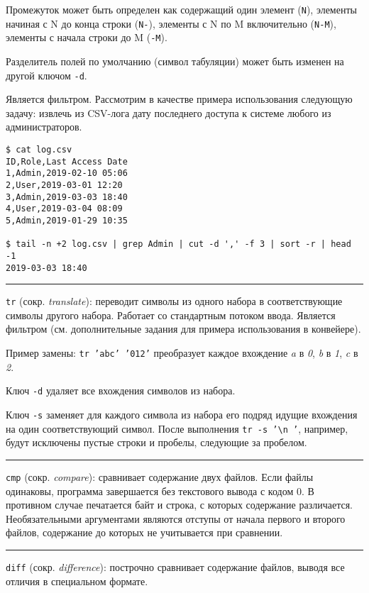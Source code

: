 \documentclass[listings]{labreport}
\begin{document}
Промежуток может быть определен как содержащий один элемент (\texttt{N}), элементы
начиная с N до конца строки (\texttt{N-}), элементы с N по M включительно (\texttt{N-M}),
элементы с начала строки до M (\texttt{-M}).

Разделитель полей по умолчанию (символ табуляции) может быть изменен на другой
ключом \texttt{-d}.

Является фильтром. Рассмотрим в качестве примера использования следующую задачу: извлечь
из CSV-лога дату последнего доступа к системе любого из администраторов.
\begin{verbatim}
$ cat log.csv
ID,Role,Last Access Date
1,Admin,2019-02-10 05:06
2,User,2019-03-01 12:20
3,Admin,2019-03-03 18:40
4,User,2019-03-04 08:09
5,Admin,2019-01-29 10:35

$ tail -n +2 log.csv | grep Admin | cut -d ',' -f 3 | sort -r | head -1
2019-03-03 18:40
\end{verbatim}

\noindent\rule{\textwidth}{1pt}

\texttt{tr} (сокр. \textit{translate}): переводит символы из одного набора
в соответствующие символы другого набора. Работает со стандартным потоком ввода. Является фильтром
(см. дополнительные задания для примера использования в конвейере).

Пример замены: \texttt{tr 'abc' '012'} преобразует каждое вхождение
\textit{a} в \textit{0}, \textit{b} в \textit{1}, \textit{c} в \textit{2}.

Ключ \texttt{-d} удаляет все вхождения символов из набора.

Ключ \texttt{-s} заменяет для каждого символа из набора его
подряд идущие вхождения на один соответствующий символ. После выполнения
\texttt{tr -s '{\textbackslash}n '}, например, будут исключены пустые строки и пробелы, следующие за пробелом.

\noindent\rule{\textwidth}{1pt}

\texttt{cmp} (сокр. \textit{compare}): сравнивает содержание двух файлов. Если файлы одинаковы,
программа завершается без текстового вывода с кодом 0. В противном случае печатается байт и строка,
с которых содержание различается. Необязательными аргументами являются отступы от начала первого и второго файлов,
содержание до которых не учитывается при сравнении.

\noindent\rule{\textwidth}{1pt}

\texttt{diff} (сокр. \textit{difference}): построчно сравнивает содержание файлов, выводя все отличия в специальном формате.
\end{document}
